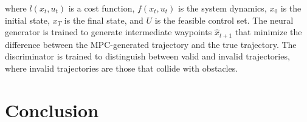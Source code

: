 where $l(x_t, u_t)$ is a cost function, $f(x_t, u_t)$ is the system dynamics, $x_0$ is the initial state, $x_T$ is the final state, and $U$ is the feasible control set. The neural generator is trained to generate intermediate waypoints $\hat{x}_{t+1}$ that minimize the difference between the MPC-generated trajectory and the true trajectory. The discriminator is trained to distinguish between valid and invalid trajectories, where invalid trajectories are those that collide with obstacles.

\section{Conclusion}



